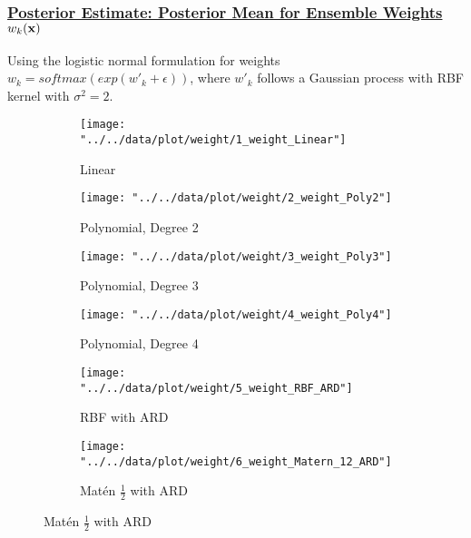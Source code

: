 \documentclass[11pt]{article}
\theoremstyle{definition}
\begin{document}
\subsubsection{\underline{Posterior Estimate: Posterior Mean for  Ensemble Weights $w_k({\bf x})$}}
Using the logistic normal formulation for weights $w_k = softmax(exp(w'_k + \epsilon))$, where $w'_k$ follows a Gaussian process with RBF kernel with $\sigma^2 = 2$.
\begin{figure}[ht]
\centering
\begin{subfigure}{.33\textwidth}
  \centering
  \texttt{[image: "../../data/plot/weight/1\_weight\_Linear"]}
  \caption{Linear}
  \label{fig:sfig11}
\end{subfigure}\hspace*{-0.1em}
\begin{subfigure}{.33\textwidth}
  \centering
  \texttt{[image: "../../data/plot/weight/2\_weight\_Poly2"]}
  \caption{Polynomial, Degree 2}
  \label{fig:sfig12}
\end{subfigure}\hspace*{-0.1em}
\begin{subfigure}{.33\textwidth}
  \centering
  \texttt{[image: "../../data/plot/weight/3\_weight\_Poly3"]}
  \caption{Polynomial, Degree 3}
  \label{fig:sfig13}
\end{subfigure}

\begin{subfigure}{.33\textwidth}
  \centering
  \texttt{[image: "../../data/plot/weight/4\_weight\_Poly4"]}
  \caption{Polynomial, Degree 4}
  \label{fig:sfig21}
\end{subfigure}\hspace*{-0.1em}
\begin{subfigure}{.33\textwidth}
  \centering
  \texttt{[image: "../../data/plot/weight/5\_weight\_RBF\_ARD"]}
  \caption{RBF with ARD}
  \label{fig:sfig22}
\end{subfigure}\hspace*{-0.1em}
\begin{subfigure}{.33\textwidth}
  \centering
  \texttt{[image: "../../data/plot/weight/6\_weight\_Matern\_12\_ARD"]}
  \caption{Mat\'{e}n $\frac{1}{2}$ with ARD}
  \label{fig:sfig23}
\end{subfigure}


\end{figure}
\end{document}
